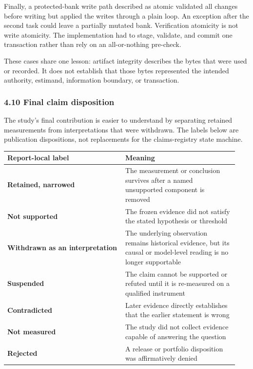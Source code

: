 \documentclass[
]{article}
\newcounter{none} %
\begin{document}
Finally, a protected-bank write path described as atomic validated all
changes before writing but applied the writes through a plain loop. An
exception after the second task could leave a partially mutated bank.
Verification atomicity is not write atomicity. The implementation had to
stage, validate, and commit one transaction rather than rely on an
all-or-nothing pre-check.

These cases share one lesson: artifact integrity describes the bytes
that were used or recorded. It does not establish that those bytes
represented the intended authority, estimand, information boundary, or
transaction.

\subsubsection{4.10 Final claim
disposition}\label{410-final-claim-disposition}

The study's final contribution is easier to understand by separating
retained measurements from interpretations that were withdrawn. The
labels below are publication dispositions, not replacements for the
claims-registry state machine.

{\def\LTcaptype{none} %
\begin{longtable}[]{@{}p{0.48\linewidth}p{0.46\linewidth}@{}}
\toprule\noalign{}
Report-local label & Meaning \\
\midrule\noalign{}
\endhead
\bottomrule\noalign{}
\endlastfoot
\textbf{Retained, narrowed} & The measurement or conclusion survives
after a named unsupported component is removed \\
\textbf{Not supported} & The frozen evidence did not satisfy the stated
hypothesis or threshold \\
\textbf{Withdrawn as an interpretation} & The underlying observation
remains historical evidence, but its causal or model-level reading is no
longer supportable \\
\textbf{Suspended} & The claim cannot be supported or refuted until it
is re-measured on a qualified instrument \\
\textbf{Contradicted} & Later evidence directly establishes that the
earlier statement is wrong \\
\textbf{Not measured} & The study did not collect evidence capable of
answering the question \\
\textbf{Rejected} & A release or portfolio disposition was affirmatively
denied \\
\end{longtable}
}
\end{document}

